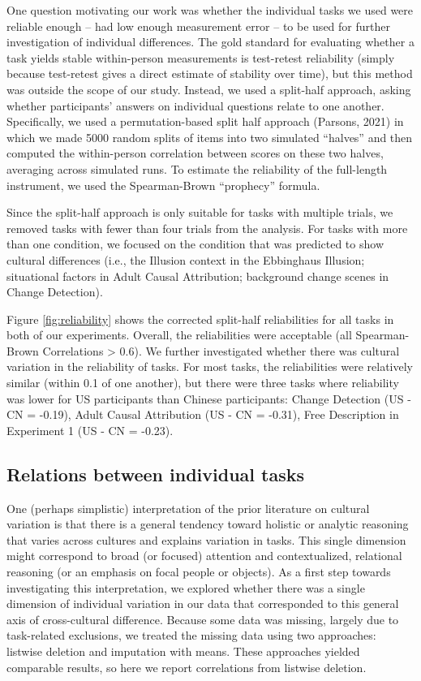 \documentclass[
  man,floatsintext]{apa6}
\begin{document}
One question motivating our work was whether the individual tasks we used were reliable enough -- had low enough measurement error -- to be used for further investigation of individual differences. The gold standard for evaluating whether a task yields stable within-person measurements is test-retest reliability (simply because test-retest gives a direct estimate of stability over time), but this method was outside the scope of our study. Instead, we used a split-half approach, asking whether participants' answers on individual questions relate to one another. Specifically, we used a permutation-based split half approach (Parsons, 2021) in which we made 5000 random splits of items into two simulated ``halves'' and then computed the within-person correlation between scores on these two halves, averaging across simulated runs. To estimate the reliability of the full-length instrument, we used the Spearman-Brown ``prophecy'' formula.

Since the split-half approach is only suitable for tasks with multiple trials, we removed tasks with fewer than four trials from the analysis. For tasks with more than one condition, we focused on the condition that was predicted to show cultural differences (i.e., the Illusion context in the Ebbinghaus Illusion; situational factors in Adult Causal Attribution; background change scenes in Change Detection).

Figure \ref{fig:reliability} shows the corrected split-half reliabilities for all tasks in both of our experiments. Overall, the reliabilities were acceptable (all Spearman-Brown Correlations \textgreater{} 0.6). We further investigated whether there was cultural variation in the reliability of tasks. For most tasks, the reliabilities were relatively similar (within 0.1 of one another), but there were three tasks where reliability was lower for US participants than Chinese participants: Change Detection (US - CN = -0.19), Adult Causal Attribution (US - CN = -0.31), Free Description in Experiment 1 (US - CN = -0.23).

\hypertarget{relations-between-individual-tasks}{%
\subsection{Relations between individual tasks}\label{relations-between-individual-tasks}}

One (perhaps simplistic) interpretation of the prior literature on cultural variation is that there is a general tendency toward holistic or analytic reasoning that varies across cultures and explains variation in tasks. This single dimension might correspond to broad (or focused) attention and contextualized, relational reasoning (or an emphasis on focal people or objects). As a first step towards investigating this interpretation, we explored whether there was a single dimension of individual variation in our data that corresponded to this general axis of cross-cultural difference. Because some data was missing, largely due to task-related exclusions, we treated the missing data using two approaches: listwise deletion and imputation with means. These approaches yielded comparable results, so here we report correlations from listwise deletion.
\end{document}
